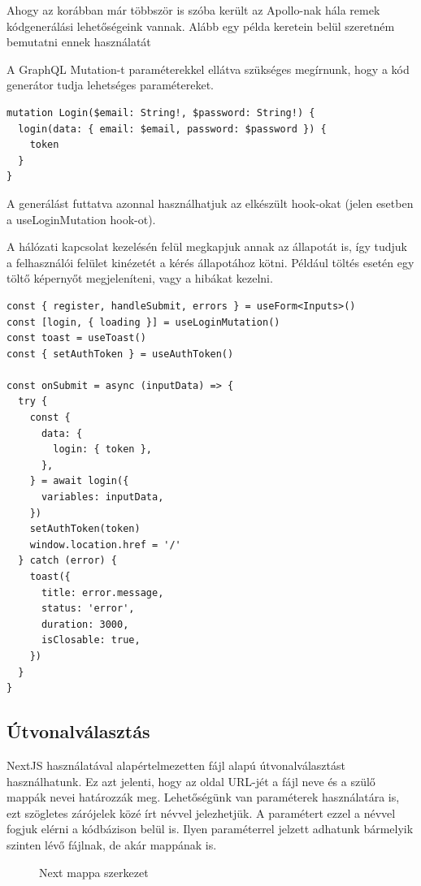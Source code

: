 Ahogy az korábban már többször is szóba került az Apollo-nak hála remek kódgenerálási lehetőségeink vannak.
Alább egy példa keretein belül szeretném bemutatni ennek használatát

A GraphQL Mutation-t paraméterekkel ellátva szükséges megírnunk, hogy a kód generátor tudja lehetséges paramétereket. 
\begin{lstlisting}[style=ES6, caption={GraphQL Shield}]
mutation Login($email: String!, $password: String!) {
  login(data: { email: $email, password: $password }) {
    token
  }
}
\end{lstlisting}

A generálást futtatva azonnal használhatjuk az elkészült hook-okat (jelen esetben a useLoginMutation hook-ot).

A hálózati kapcsolat kezelésén felül megkapjuk annak az állapotát is, így tudjuk a felhasználói felület kinézetét a kérés állapotához kötni.
Például töltés esetén egy töltő képernyőt megjeleníteni, vagy a hibákat kezelni.

\begin{lstlisting}[style=ES6, caption={Bejelentkezés kódrészlet}]
const { register, handleSubmit, errors } = useForm<Inputs>()
const [login, { loading }] = useLoginMutation()
const toast = useToast()
const { setAuthToken } = useAuthToken()

const onSubmit = async (inputData) => {
  try {
    const {
      data: {
        login: { token },
      },
    } = await login({
      variables: inputData,
    })
    setAuthToken(token)
    window.location.href = '/'
  } catch (error) {
    toast({
      title: error.message,
      status: 'error',
      duration: 3000,
      isClosable: true,
    })
  }
}
\end{lstlisting}

\subsection{Útvonalválasztás}
NextJS használatával alapértelmezetten fájl alapú útvonalválasztást használhatunk.
Ez azt jelenti, hogy az oldal URL-jét a fájl neve és a szülő mappák nevei határozzák meg.
Lehetőségünk van paraméterek használatára is, ezt szögletes zárójelek közé írt névvel jelezhetjük.
A paramétert ezzel a névvel fogjuk elérni a kódbázison belül is.
Ilyen paraméterrel jelzett adhatunk bármelyik szinten lévő fájlnak, de akár mappának is.

\begin{figure}
  \caption{Next mappa szerkezet}
  \label{fig:next}
\end{figure}

